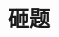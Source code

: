 \documentclass[12pt,a4paper,titlepage]{article}
\begin{document}
\begin{CJK}{UTF8}{gbsn}
	\subsection{砸题}

\end{CJK}
\end{document}
